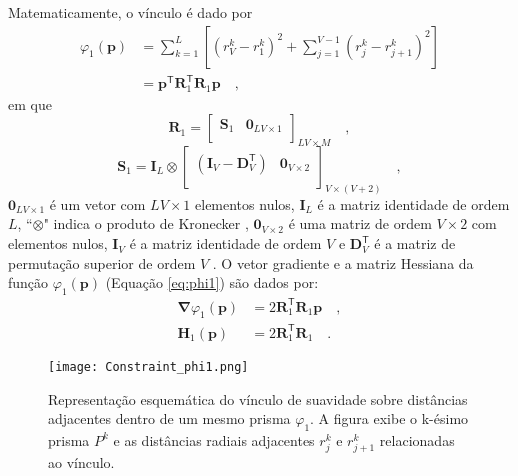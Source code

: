 Matematicamente, o vínculo é dado por \begin{equation}\label{eq:phi1}
\begin{split}
\varphi_{1}(\mathbf{p}) &= \sum\limits^{L}_{k=1}\left[\left(r^{k}_{V}-r^{k}_{1}\right)^2 + \sum\limits^{V-1}_{j=1}\left(r^{k}_{j}-r^{k}_{j+1}\right)^2\right]\\
&= \mathbf{p}^{\mathsf{T}} \mathbf{R}^{\mathsf{T}}_{1}\mathbf{R}_{1} \mathbf{p} \quad ,
\end{split}
\end{equation}
em que
\begin{equation}
\mathbf{R}_{1} = 
\begin{bmatrix}
\mathbf{S}_{1} &
\mathbf{0}_{LV \times 1} \\
\end{bmatrix}_{LV \times M} \quad ,
\label{eq:R1-matrix}
\end{equation}
\begin{equation}
\mathbf{S}_{1} = 
\mathbf{I}_{L} \otimes 
\begin{bmatrix}
\left( \mathbf{I}_{V} - \mathbf{D}_{V}^\mathsf{T} \right) & \mathbf{0}_{V \times 2} \\
\end{bmatrix}_{V \times (V+2)} \quad ,
\label{eq:S1-matrix}
\end{equation}
$ \mathbf{0}_{LV \times 1} $ é um vetor com $ LV \times 1 $ elementos nulos, $\mathbf{I}_{L}$ é a matriz identidade de ordem $L$, ``$\otimes$" indica o produto de Kronecker \cite{}\cite[][ p. 243]{horn_johnson1991}, $\mathbf{0}_{V \times 2}$ é uma matriz de ordem $V \times 2$ com elementos nulos, 
$\mathbf{I}_{V}$ é a matriz identidade de ordem $V$ e $\mathbf{D}_{V}^\mathsf{T}$ é a matriz de permutação superior de ordem $V$ \cite[][ p. 20]{golub-vanloan2013}. O vetor gradiente e a matriz Hessiana da função $\varphi_{1}(\mathbf{p})$ (Equação \ref{eq:phi1}) são dados por:
\begin{equation}\label{eq:phi1_gh}
\begin{split}
\boldsymbol{\nabla}\varphi_{1}(\mathbf{p}) &= 2 \mathbf{R}^\mathsf{T}_{1}\mathbf{R}_{1}\mathbf{p} \quad , \\
\mathbf{H}_{1}(\mathbf{p}) &= 2\mathbf{R}^\mathsf{T}_{1}\mathbf{R}_{1} \quad .
\end{split}
\end{equation}

\begin{figure}[!htb]
	\centering
	\texttt{[image: Constraint\_phi1.png]}
	\caption{Representação esquemática do vínculo de suavidade sobre distâncias adjacentes dentro de um mesmo prisma $\varphi_{1}$. A figura exibe o k-ésimo prisma $P^k$ e as distâncias radiais adjacentes $r_j^k$ e $r_{j+1}^k$ relacionadas ao vínculo.}
	\label{fig:phi1}
\end{figure}

